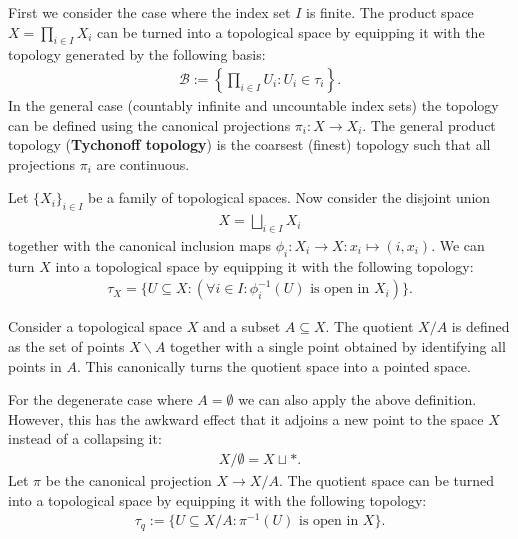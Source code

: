     \begin{construct}\label{topology:tychonoff_topology}
        First we consider the case where the index set $I$ is finite. The product space $X = \prod_{i\in I}X_i$ can be turned into a topological space by equipping it with the topology generated by the following basis:
        \begin{gather}
            \mathcal{B} := \left\{\prod_{i\in I}U_i:U_i\in\tau_i\right\}.
        \end{gather}
        In the general case (countably infinite and uncountable index sets) the topology can be defined using the canonical projections $\pi_i:X\rightarrow X_i$. The general product topology (\textbf{Tychonoff topology}) is the coarsest (finest) topology such that all projections $\pi_i$ are continuous.
    \end{construct}

    \begin{construct}\label{topology:disjoint_union}
        Let $\{X_i\}_{i\in I}$ be a family of topological spaces. Now consider the disjoint union
        \begin{gather}
            X = \bigsqcup_{i\in I} X_i
        \end{gather}
        together with the canonical inclusion maps $\phi_i:X_i\rightarrow X:x_i\mapsto(i, x_i)$. We can turn $X$ into a topological space by equipping it with the following topology:
        \begin{gather}
            \tau_X = \big\{U\subseteq X:(\forall i\in I:\phi_i^{-1}(U)\text{ is open in }X_i)\big\}.
        \end{gather}
    \end{construct}

    \begin{construct}
        Consider a topological space $X$ and a subset $A\subseteq X$. The quotient $X/A$ is defined as the set of points $X\backslash A$ together with a single point obtained by identifying all points in $A$. This canonically turns the quotient space into a pointed space.

        For the degenerate case where $A=\emptyset$ we can also apply the above definition. However, this has the awkward effect that it adjoins a new point to the space $X$ instead of a collapsing it:
        \begin{gather}
            X/\emptyset = X\sqcup\ast.
        \end{gather}
        Let $\pi$ be the canonical projection $X\rightarrow X/A$. The quotient space can be turned into a topological space by equipping it with the following topology:
        \begin{gather}
            \label{topology:quotient_space}
            \tau_q := \big\{U\subseteq X/A:\pi^{-1}(U)\text{ is open in }X\big\}.
        \end{gather}
    \end{construct}

